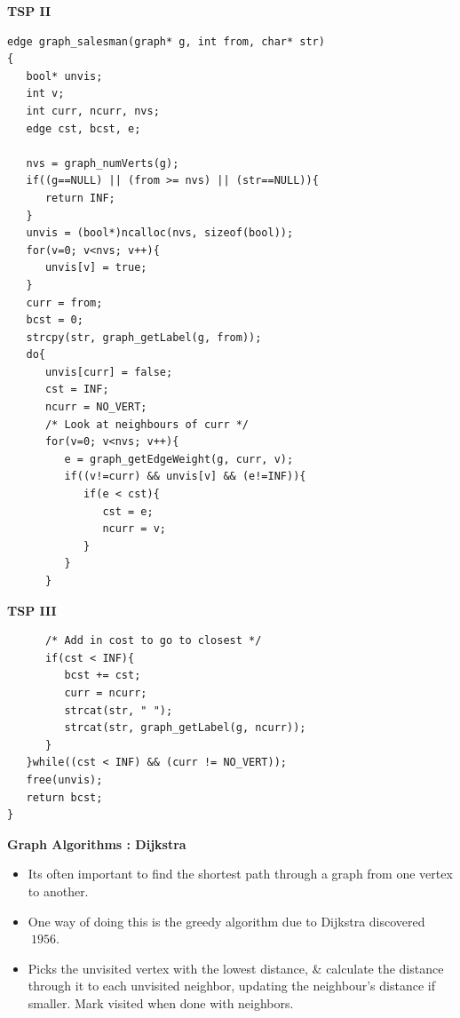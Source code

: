 \newpage
{\samepage
\begin{center}
{\Large{\bf TSP II}}
\end{center}
{\small
\begin{verbatim}
edge graph_salesman(graph* g, int from, char* str)
{
   bool* unvis;
   int v;
   int curr, ncurr, nvs;
   edge cst, bcst, e;

   nvs = graph_numVerts(g);
   if((g==NULL) || (from >= nvs) || (str==NULL)){
      return INF;
   }
   unvis = (bool*)ncalloc(nvs, sizeof(bool));
   for(v=0; v<nvs; v++){
      unvis[v] = true;
   }
   curr = from;
   bcst = 0;
   strcpy(str, graph_getLabel(g, from));
   do{
      unvis[curr] = false;
      cst = INF;
      ncurr = NO_VERT;
      /* Look at neighbours of curr */
      for(v=0; v<nvs; v++){
         e = graph_getEdgeWeight(g, curr, v);
         if((v!=curr) && unvis[v] && (e!=INF)){
            if(e < cst){
               cst = e;
               ncurr = v;
            }
         }
      }
\end{verbatim}
}}


\newpage
{\samepage
\begin{center}
{\Large{\bf TSP III}}
\end{center}
{\small
\begin{verbatim}
      /* Add in cost to go to closest */
      if(cst < INF){
         bcst += cst;
         curr = ncurr;
         strcat(str, " ");
         strcat(str, graph_getLabel(g, ncurr));
      }
   }while((cst < INF) && (curr != NO_VERT));
   free(unvis);
   return bcst;
}
\end{verbatim}
}}

\newpage
{\samepage
\begin{center}
{\Large{\bf Graph Algorithms : Dijkstra}}
\end{center}
{\small
\begin{itemize}
\item Its often important to find the shortest path through a graph
from one vertex to another.
\item One way of doing this is the greedy algorithm due to Dijkstra
discovered $~1956$.
\item Picks the unvisited vertex with the lowest distance, \& calculate the distance through it to each unvisited neighbor, updating the neighbour's distance if smaller. Mark visited when done with neighbors.
\end{itemize}
}}

